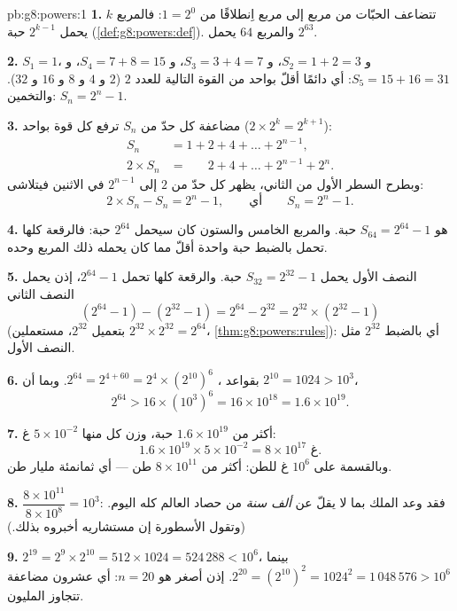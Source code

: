 \begin{solution}{pb:g8:powers:1}
\textbf{1.} تتضاعف الحبّات من مربع إلى مربع اِنطلاقًا من
$1 = 2^0$: فالمربع $k$ يحمل $2^{k-1}$ حبة
(\cref{def:g8:powers:def}). والمربع $64$ يحمل $2^{63}$.

\textbf{2.} $S_1 = 1$، و $S_2 = 1 + 2 = 3$، و $S_3 = 3 + 4 = 7$،
و $S_4 = 7 + 8 = 15$، و $S_5 = 15 + 16 = 31$: أي دائمًا أقلّ بواحد من
القوة التالية للعدد $2$ ($2$ و $4$ و $8$ و $16$ و $32$). والتخمين:
$S_n = 2^n - 1$.

\textbf{3.} مضاعفة كل حدّ من $S_n$ ترفع كل قوة
بواحد ($2 \times 2^{k} = 2^{k+1}$):
\begin{align*}
S_n &= 1 + 2 + 4 + \dots + 2^{n-1}, \\
2 \times S_n &= \phantom{1 + {}} 2 + 4 + \dots + 2^{n-1} + 2^n .
\end{align*}
وبطرح السطر الأول من الثاني، يظهر كل حدّ من $2$
إلى $2^{n-1}$ في الاثنين فيتلاشى:
\[
2 \times S_n - S_n = 2^n - 1,
\qquad\text{أي}\qquad
S_n = 2^n - 1 .
\]

\textbf{4.}  هو $S_{64} = 2^{64} - 1$ حبة. والمربع
الخامس والستون كان سيحمل $2^{64}$ حبة: فالرقعة كلها
تحمل بالضبط حبة واحدة أقلّ مما كان يحمله ذلك المربع وحده.

\textbf{5.} النصف الأول يحمل $S_{32} = 2^{32} - 1$ حبة.
والرقعة كلها تحمل $2^{64} - 1$، إذن يحمل النصف الثاني
\[
\left(2^{64} - 1\right) - \left(2^{32} - 1\right)
= 2^{64} - 2^{32}
= 2^{32} \times \left(2^{32} - 1\right)
\]
(بتعميل $2^{32}$، مستعملين $2^{32} \times 2^{32} = 2^{64}$،
\cref{thm:g8:powers:rules}): أي بالضبط $2^{32}$ مثل النصف
الأول.

\textbf{6.} بقواعد ، $2^{64} = 2^{4 + 60} =
2^4 \times \left(2^{10}\right)^6$. وبما أن $2^{10} = 1024 > 10^3$،
\[
2^{64} > 16 \times \left(10^3\right)^6 = 16 \times 10^{18}
= 1.6 \times 10^{19} .
\]

\textbf{7.} أكثر من $1.6 \times 10^{19}$ حبة، وزن كل منها
$5 \times 10^{-2}$ غ:
\[
1.6 \times 10^{19} \times 5 \times 10^{-2}
= 8 \times 10^{17} \text{ غ} .
\]
وبالقسمة على $10^6$ غ للطن: أكثر من $8 \times 10^{11}$
طن --- أي ثمانمئة مليار طن.

\textbf{8.} $\dfrac{8 \times 10^{11}}{8 \times 10^{8}} = 10^3$:
فقد وعد الملك بما لا يقلّ عن \emph{ألف سنة} من حصاد
العالم كله اليوم. (وتقول الأسطورة إن مستشاريه أخبروه
بذلك.)

\textbf{9.} $2^{19} = 2^9 \times 2^{10} = 512 \times 1024 =
524\,288 < 10^6$، بينما $2^{20} = \left(2^{10}\right)^2 =
1024^2 = 1\,048\,576 > 10^6$. إذن أصغر  هو
$n = 20$: أي عشرون مضاعفة تتجاوز المليون.


\end{solution}
